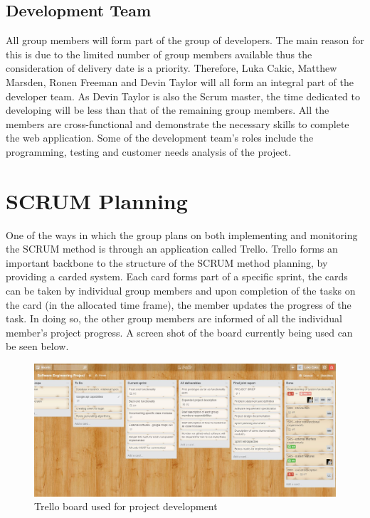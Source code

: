 \documentclass[10pt, a4paper, onecolumn]{scrartcl}
\begin{document}
		\subsection{Development Team}
		
			All group members will form part of the group of developers. The main reason for this is due to the limited number of group members available thus the consideration of delivery date is a priority. Therefore, Luka Cakic, Matthew Marsden, Ronen Freeman and Devin Taylor will all form an integral part of the developer team. As Devin Taylor is also the Scrum master, the time dedicated to developing will be less than that of the remaining group members. All the members are cross-functional and demonstrate the necessary skills to complete the web application. Some of the development team's roles include the programming, testing and customer needs analysis of the project. 
	
	\section{SCRUM Planning}
	
		One of the ways in which the group plans on both implementing and monitoring the SCRUM method is through an application called Trello. Trello forms an important backbone to the structure of the SCRUM method planning, by providing a carded system. Each card forms part of a specific sprint, the cards can be taken by individual group members and upon completion of the tasks on the card (in the allocated time frame), the member updates the progress of the task. In doing so, the other group members are informed of all the individual member's project progress. A screen shot of the board currently being used can be seen below. 
		
		\begin{figure}[h!]
			\centering
			\includegraphics[scale = 0.4]{Images/Trello.JPG}
			\caption{Trello board used for project development}
			\label{menu}
		\end{figure}
		
\end{document}
